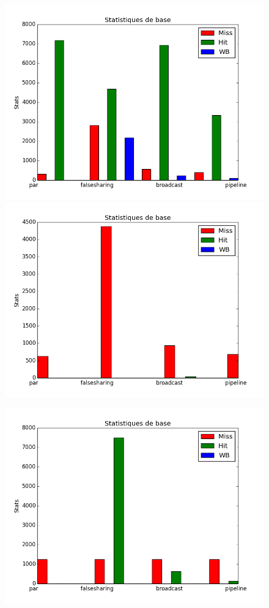 \begin{frame}
\begin{figure}[H]
   \begin{minipage}[l]{.46\textwidth}
     \includegraphics[scale=0.25]{images/stats_L1.png}
   \end{minipage} \hfill
   \begin{minipage}[r]{.46\textwidth}
     \includegraphics[scale=0.25]{images/stats_L2.png}
   \end{minipage}
\end{figure}

\begin{figure}[t!]
  \includegraphics[width=.4\textwidth]{images/stats_L3.png}
\end{figure}
\end{frame}

